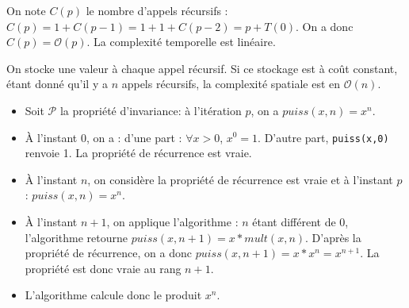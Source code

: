 \ifprof
\begin{corrige}
On note $C(p)$ le nombre d'appels récursifs : $C(p) = 1+C(p-1) = 1+1+C(p-2)=p+T(0)$. On a donc $C(p)=\mathcal{O}(p)$. La complexité temporelle est linéaire.
\end{corrige}
\else
\fi

\ifprof
\begin{corrige}
On stocke une valeur à chaque appel récursif. Si ce stockage est à coût constant, étant donné qu'il y a $n$ appels récursifs, la complexité spatiale est en $\mathcal{O}(n)$.
\end{corrige}
\else
\fi


\setcounter{question}{0}




\ifprof
{}
\else
\fi




\ifprof
\begin{corrige}
\begin{itemize}
\item Soit $\mathcal{P}$ la propriété d'invariance: à l'itération $p$, on a $puiss(x,n)=x^n$. 
\item À l'instant 0, on a : d'une part : $\forall x>0$, $x^0 = 1$. D'autre part, \texttt{puiss(x,0)} renvoie 1. La 
propriété de récurrence est vraie. 
\item À l'instant $n$, on considère la propriété de récurrence est vraie et à l'instant $p$ : $puiss(x,n)=x^n$.
\item À l'instant $n+1$, on applique l'algorithme : $n$ étant différent de 0, l'algorithme retourne 
$puiss(x,n+1)=x*mult(x,n)$. D'après la propriété de récurrence, on a donc $puiss(x,n+1)=x*x^n=x^{n+1} $. La propriété 
est donc vraie au rang $n+1$.
\item L'algorithme calcule donc le produit $x^n$.
\end{itemize}   
\end{corrige}
\else
\fi

